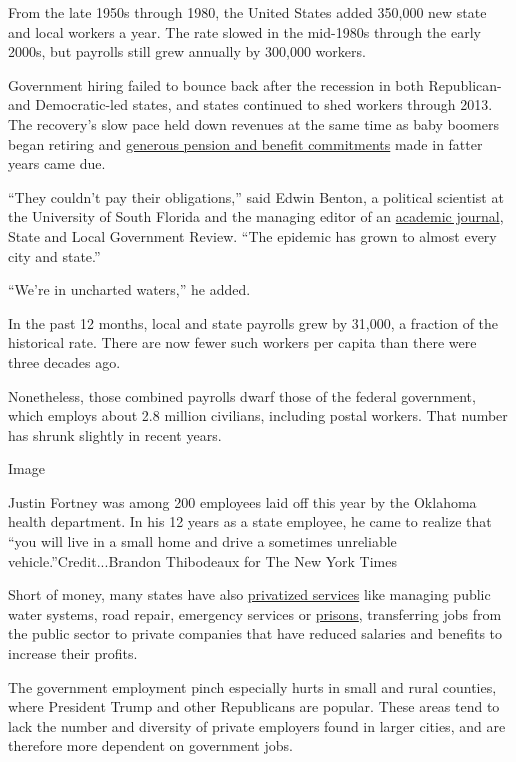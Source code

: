 From the late 1950s through 1980, the United States added 350,000 new
state and local workers a year. The rate slowed in the mid-1980s through
the early 2000s, but payrolls still grew annually by 300,000 workers.

Government hiring failed to bounce back after the recession in both
Republican- and Democratic-led states, and states continued to shed
workers through 2013. The recovery's slow pace held down revenues at the
same time as baby boomers began retiring and
\href{https://www.nytimes3xbfgragh.onion/2018/04/14/business/pension-finance-oregon.html}{generous
pension and benefit commitments} made in fatter years came due.

``They couldn't pay their obligations,'' said Edwin Benton, a political
scientist at the University of South Florida and the managing editor of
an \href{http://journals.sagepub.com/home/slgb}{academic journal}, State
and Local Government Review. ``The epidemic has grown to almost every
city and state.''

``We're in uncharted waters,'' he added.

In the past 12 months, local and state payrolls grew by 31,000, a
fraction of the historical rate. There are now fewer such workers per
capita than there were three decades ago.

Nonetheless, those combined payrolls dwarf those of the federal
government, which employs about 2.8 million civilians, including postal
workers. That number has shrunk slightly in recent years.

Image

Justin Fortney was among 200 employees laid off this year by the
Oklahoma health department. In his 12 years as a state employee, he came
to realize that ``you will live in a small home and drive a sometimes
unreliable vehicle.''Credit...Brandon Thibodeaux for The New York Times

Short of money, many states have also
\href{https://www.nytimes3xbfgragh.onion/interactive/2016/08/02/business/dealbook/this-is-your-life-private-equity.html}{privatized
services} like managing public water systems, road repair, emergency
services or
\href{https://www.nytimes3xbfgragh.onion/2018/04/10/us/private-prisons-escapes-riots.html}{prisons},
transferring jobs from the public sector to private companies that have
reduced salaries and benefits to increase their profits.

The government employment pinch especially hurts in small and rural
counties, where President Trump and other Republicans are popular. These
areas tend to lack the number and diversity of private employers found
in larger cities, and are therefore more dependent on government jobs.

